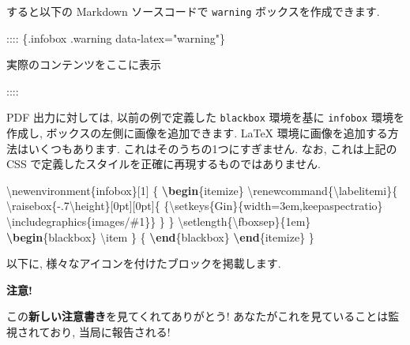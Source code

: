 \documentclass[
  11pt,
  lualatex,ja=standard,jafont=noto]{bxjsreport}
\newenvironment{Shaded}{\begin{snugshade}}{\end{snugshade}}
\newcommand{\BuiltInTok}[1]{#1}
\newcommand{\ExtensionTok}[1]{#1}
\newcommand{\FunctionTok}[1]{\textcolor[rgb]{0.00,0.00,0.00}{#1}}
\newcommand{\KeywordTok}[1]{\textcolor[rgb]{0.13,0.29,0.53}{\textbf{#1}}}
\newcommand{\NormalTok}[1]{#1}
\newenvironment{infobox}[1]{\begin{itemize}\renewcommand{\labelitemi}{\raisebox{-.7\height}[0pt][0pt]{%
  {\setkeys{Gin}{width=3em,keepaspectratio}\texttt{[image: \_latex/\_img/\#1]}}}}
  \setlength{\fboxsep}{1em}
  \begin{greyblock}
  \item
  }{\end{greyblock}\end{itemize}
}
\begin{document}
すると以下の Markdown ソースコードで \texttt{warning} ボックスを作成できます.

\begin{Shaded}
\begin{Highlighting}[]
\NormalTok{:::: \{.infobox .warning data{-}latex="warning"\}}

\NormalTok{実際のコンテンツをここに表示}

\NormalTok{::::}
\end{Highlighting}
\end{Shaded}

PDF 出力に対しては, 以前の例で定義した \texttt{blackbox} 環境を基に \texttt{infobox} 環境を作成し, ボックスの左側に画像を追加できます. LaTeX 環境に画像を追加する方法はいくつもあります. これはそのうちの1つにすぎません. なお, これは上記の CSS で定義したスタイルを正確に再現するものではありません.

\begin{Shaded}
\begin{Highlighting}[numbers=left,,]
\FunctionTok{\textbackslash{}newenvironment}\NormalTok{\{infobox\}[1]}
\NormalTok{  \{}
  \KeywordTok{\textbackslash{}begin}\NormalTok{\{}\ExtensionTok{itemize}\NormalTok{\}}
  \FunctionTok{\textbackslash{}renewcommand}\NormalTok{\{}\ExtensionTok{\textbackslash{}labelitemi}\NormalTok{\}\{}
    \FunctionTok{\textbackslash{}raisebox}\NormalTok{\{{-}.7}\FunctionTok{\textbackslash{}height}\NormalTok{\}[0pt][0pt]\{}
\NormalTok{      \{}\FunctionTok{\textbackslash{}setkeys}\NormalTok{\{Gin\}\{width=3em,keepaspectratio\}}
        \BuiltInTok{\textbackslash{}includegraphics}\NormalTok{\{}\ExtensionTok{images/\#1}\NormalTok{\}\}}
\NormalTok{    \}}
\NormalTok{  \}}
  \FunctionTok{\textbackslash{}setlength}\NormalTok{\{}\FunctionTok{\textbackslash{}fboxsep}\NormalTok{\}\{1em\}}
  \KeywordTok{\textbackslash{}begin}\NormalTok{\{}\ExtensionTok{blackbox}\NormalTok{\}}
  \FunctionTok{\textbackslash{}item}
\NormalTok{  \}}
\NormalTok{  \{}
  \KeywordTok{\textbackslash{}end}\NormalTok{\{}\ExtensionTok{blackbox}\NormalTok{\}}
  \KeywordTok{\textbackslash{}end}\NormalTok{\{}\ExtensionTok{itemize}\NormalTok{\}}
\NormalTok{  \}}
\end{Highlighting}
\end{Shaded}

以下に, 様々なアイコンを付けたブロックを掲載します.

\begin{infobox}{warning}
\textbf{注意!}

この\textbf{新しい注意書き}を見てくれてありがとう! あなたがこれを見ていることは監視されており, 当局に報告される!

\end{infobox}
\end{document}
